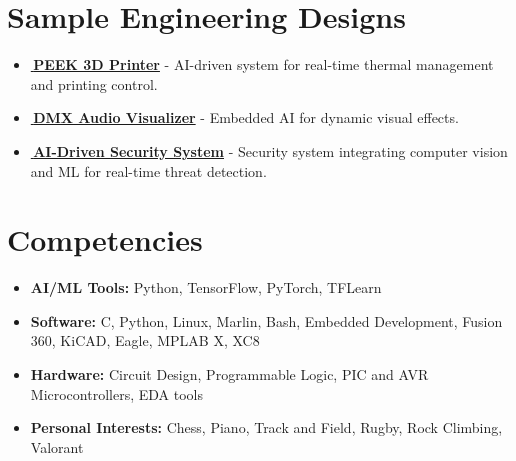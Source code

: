 \documentclass[12pt]{FreemanCV}
\begin{document}

\vspace*{-10pt} \section{Sample Engineering Designs} { \vspace*{-7pt} \begin{itemize}[leftmargin=10pt] \item \href{https://github.com/jfcbooth/3dpp}{\linkcolor\scriptsize\faLink\normalcolor\normalsize\,\textbf{PEEK 3D Printer}} - AI-driven system for real-time thermal management and printing control. \item \href{https://github.com/microchip-pic-avr-examples/pic16f56q71-audio-light-show-mplab-mcc}{\linkcolor\scriptsize\faLink\normalcolor\normalsize\,\textbf{DMX Audio Visualizer}} - Embedded AI for dynamic visual effects. \item \href{https://github.com/jfcbooth/security_system}{\linkcolor\scriptsize\faLink\normalcolor\normalsize\,\textbf{AI-Driven Security System}} - Security system integrating computer vision and ML for real-time threat detection. \end{itemize} }



\section{Competencies} \begin{itemize}[leftmargin=10pt] \itemsep-5pt \item \textbf{AI/ML Tools:} Python, TensorFlow, PyTorch, TFLearn \item \textbf{Software:} C, Python, Linux, Marlin, Bash, Embedded Development, Fusion 360, KiCAD, Eagle, MPLAB X, XC8 \item \textbf{Hardware:} Circuit Design, Programmable Logic, PIC and AVR Microcontrollers, EDA tools \item \textbf{Personal Interests:} Chess, Piano, Track and Field, Rugby, Rock Climbing, Valorant \end{itemize}

\vfill \vspace{1cm} 
\end{document}
